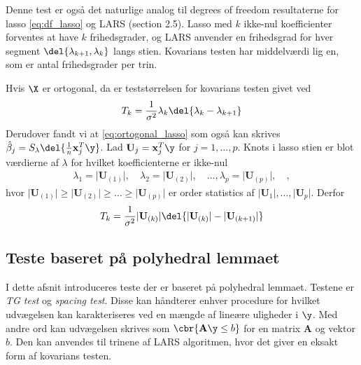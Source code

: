 Denne test er også det naturlige analog til degrees of freedom resultaterne for lasso \eqref{eq:df_lasso} og LARS (section 2.5).
Lasso med \(k\) ikke-nul koefficienter forventes at have \(k\) frihedsgrader, og LARS anvender en frihedsgrad for hver segment \(\del{\lambda_{k+1}, \lambda_k}\) langs stien.
Kovarians testen har middelværdi lig en, som er antal frihedsgrader per trin.


Hvis \(\X\) er ortogonal, da er teststørrelsen for kovarians testen givet ved
\begin{align*}
T_k = \frac{1}{\sigma^2} \lambda_k \del{\lambda_k - \lambda_{k+1}}
\end{align*} 
Derudover fandt vi at \eqref{eq:ortogonal_lasso} som også kan skrives \(\hat{\beta}_j = S_\lambda \del{\frac{1}{n} \mathbf{x}_j^T \y}\).
Lad \(\mathbf{U}_j = \mathbf{x}_j^T \y\) for \(j=1,\ldots, p\). 
Knots i lasso stien er blot værdierne af \(\lambda\) for hvilket koefficienterne er ikke-nul
\begin{align*}
\lambda_1 = \vert \mathbf{U}_{(1)} \vert, \quad \lambda_2 = \vert \mathbf{U}_{(2)} \vert, \quad \ldots, \lambda_p = \vert \mathbf{U}_{(p)} \vert, \quad,
\end{align*}
hvor \(\vert \mathbf{U}_{(1)} \vert \geq \vert \mathbf{U}_{(2)} \vert \geq \dots \geq \vert \mathbf{U}_{(p)} \vert\) er order statistics af \(\vert \mathbf{U}_1 \vert, \ldots, \vert \mathbf{U}_p \vert\).
Derfor 
\begin{align*}
T_k = \frac{1}{\sigma^2}  \vert \mathbf{U}_{(k)} \vert \del{ \vert \mathbf{U}_{(k)} \vert -  \vert \mathbf{U}_{(k+1)} \vert}
\end{align*}

\newpage
\subsection{Teste baseret på polyhedral lemmaet}
\citep{post_inference}


I dette afsnit introduceres teste der er baseret på polyhedral lemmaet.
Testene er \textit{TG test} og \textit{spacing test}. 
Disse kan håndterer enhver procedure for hvilket udvægelsen kan karakteriseres ved en mængde af lineære uligheder i \(\y\).
Med andre ord kan udvægelsen skrives som \(\cbr{\mathbf{A} \y \leq b}\) for en matrix \(\mathbf{A}\) og vektor \(b\).
Den kan anvendes til trinene af LARS algoritmen, hvor det giver en eksakt form af kovarians testen.


